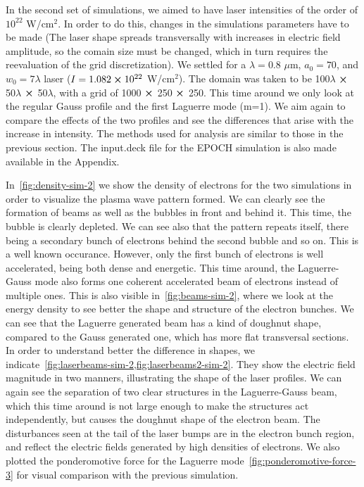 \documentclass[12pt, class=report, crop=false]{standalone}
\begin{document}
In the second set of simulations, we aimed to have laser intensities of the order of $10^{22}$ W/cm$^2$. In order to do this, changes in the simulations parameters have to be made (The laser shape spreads transversally with increases in electric field amplitude, so the comain size must be changed, which in turn requires the reevaluation of the grid discretization). We settled for a \(\lambda = 0.8\) \(\mu\)m, \(a_0=70\), and \(w_0 = 7\lambda\) laser (\(I = 1.082\cp 10^{22}\) W/cm$^2$). The domain was taken to be 100\(\lambda\) $\cp$ 50\(\lambda\) $\cp$ 50\(\lambda\), with a grid of 1000 $\cp$ 250 $\cp$ 250. This time around we only look at the regular Gauss profile and the first Laguerre mode (m=1). We aim again to compare the effects of the two profiles and see the differences that arise with the increase in intensity. The methods used for analysis are similar to those in the previous section. The input.deck file for the EPOCH simulation is also made available in the Appendix.

In~\cref{fig:density-sim-2} we show the density of electrons for the two simulations in order to visualize the plasma wave pattern formed. We can clearly see the formation of beams as well as the bubbles in front and behind it. This time, the bubble is clearly depleted. We can see also that the pattern repeats itself, there being a secondary bunch of electrons behind the second bubble and so on. This is a well known occurance. However, only the first bunch of electrons is well accelerated, being both dense and energetic. This time around, the Laguerre-Gauss mode also forms one coherent accelerated beam of electrons instead of multiple ones. This is also visible in~\cref{fig:beams-sim-2}, where we look at the energy density to see better the shape and structure of the electron bunches. We can see that the Laguerre generated beam has a kind of doughnut shape, compared to the Gauss generated one, which has more flat transversal sections. In order to understand better the difference in shapes, we indicate~\cref{fig:laserbeams-sim-2,fig:laserbeams2-sim-2}. They show the electric field magnitude in two manners, illustrating the shape of the laser profiles. We can again see the separation of two clear structures in the Laguerre-Gauss beam, which this time around is not large enough to make the structures act independently, but causes the doughnut shape of the electron beam. The disturbances seen at the tail of the laser bumps are in the electron bunch region, and reflect the electric fields generated by high densities of electrons. We also plotted the ponderomotive force for the Laguerre mode~\cref{fig:ponderomotive-force-3} for visual comparison with the previous simulation.
\end{document}
